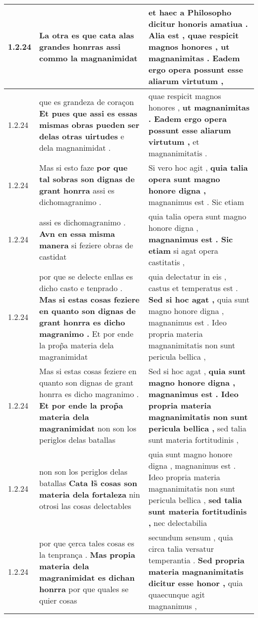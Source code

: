 \begin{tabular}{|p{1cm}|p{6.5cm}|p{6.5cm}|}
1.2.24 & La otra es \textbf{ que cata alas grandes honrras } assi commo la magnanimidat & et haec a Philosopho dicitur honoris amatiua . Alia est , \textbf{ quae respicit magnos honores , } ut magnanimitas . Eadem ergo opera possunt esse aliarum virtutum , \\\hline
1.2.24 & que es grandeza de coraçon \textbf{ Et pues que assi es essas mismas obras pueden ser delas otras uirtudes } e dela magnanimidat . & quae respicit magnos honores , \textbf{ ut magnanimitas . Eadem ergo opera possunt esse aliarum virtutum , } et magnanimitatis . \\\hline
1.2.24 & Mas si esto faze \textbf{ por que tal sobras son dignas de grant honrra } assi es dichomagranimo . & Si vero hoc agit , \textbf{ quia talia opera sunt magno honore digna , } magnanimus est . Sic etiam \\\hline
1.2.24 & assi es dichomagranimo . \textbf{ Avn en essa misma manera } si feziere obras de castidat & quia talia opera sunt magno honore digna , \textbf{ magnanimus est . Sic etiam } si agat opera castitatis , \\\hline
1.2.24 & por que se delecte enllas es dicho casto e tenprado . \textbf{ Mas si estas cosas feziere en quanto son dignas de grant honrra es dicho magranimo . } Et por ende la prop̃a materia dela magranimidat & quia delectatur in eis , castus et temperatus est . \textbf{ Sed si hoc agat , } quia sunt magno honore digna , magnanimus est . Ideo propria materia magnanimitatis non sunt pericula bellica , \\\hline
1.2.24 & Mas si estas cosas feziere en quanto son dignas de grant honrra es dicho magranimo . \textbf{ Et por ende la prop̃a materia dela magranimidat } non son los periglos delas batallas & Sed si hoc agat , \textbf{ quia sunt magno honore digna , magnanimus est . Ideo propria materia magnanimitatis non sunt pericula bellica , } sed talia sunt materia fortitudinis , \\\hline
1.2.24 & non son los periglos delas batallas \textbf{ Cata łs̃ cosas son materia dela fortaleza } nin otrosi las cosas delectables & quia sunt magno honore digna , magnanimus est . Ideo propria materia magnanimitatis non sunt pericula bellica , \textbf{ sed talia sunt materia fortitudinis , } nec delectabilia \\\hline
1.2.24 & por que çerca tales cosas es la tenprança . \textbf{ Mas propia materia dela magranimidat es dichan honrra } por que quales se quier cosas & secundum sensum , quia circa talia versatur temperantia . \textbf{ Sed propria materia magnanimitatis dicitur esse honor , } quia quaecunque agit magnanimus , \\\hline

\end{tabular}
